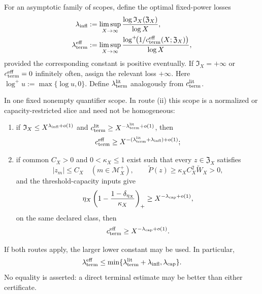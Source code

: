 For an asymptotic family of scopes, define the optimal fixed-power losses
\begin{align}
 \lambda_{\rm infl}
 &:=
 \limsup_{X\to\infty}
 \frac{\log \mathfrak I_X(\mathfrak Z_X)}{\log X},
 \label{eq:tpc64-lambda-infl-definition}\\
 \lambda_{\rm term}^{\rm eff}
 &:=
 \limsup_{X\to\infty}
 \frac{\log^+\!\bigl(
       1/c_{\rm term}^{\rm eff}(X;\mathfrak Z_X)\bigr)}
      {\log X},
 \label{eq:tpc64-lambda-term-eff-definition}
\end{align}
provided the corresponding constant is positive eventually.  If
\(\mathfrak I_X=+\infty\) or
\(c_{\rm term}^{\rm eff}=0\) infinitely often, assign the relevant loss
\(+\infty\).  Here \(\log^+u:=\max\{\log u,0\}\).  Define
\(\lambda_{\rm term}^{\rm lit}\) analogously from
\(c_{\rm term}^{\rm lit}\).

\begin{proposition}
\label{prop:tpc64-two-effective-loss-routes}
In one fixed nonempty quantifier scope.  In route \textup{(ii)} this scope
is a normalized or capacity-restricted slice and need not be homogeneous:
\begin{enumerate}[label=\textup{(\roman*)},leftmargin=3em]
 \item if
       \(\mathfrak I_X\le X^{\lambda_{\rm infl}+o(1)}\) and
       \(c_{\rm term}^{\rm lit}
          \ge X^{-\lambda_{\rm term}^{\rm lit}+o(1)}\),
       then
       \begin{equation}
        c_{\rm term}^{\rm eff}
        \ge
        X^{-(\lambda_{\rm term}^{\rm lit}
             +\lambda_{\rm infl})+o(1)};
        \label{eq:tpc64-inflated-terminal-exponent}
       \end{equation}
 \item if common \(C_X>0\) and \(0<\kappa_X\le1\) exist such that every
       \(z\in\mathfrak Z_X\) satisfies
       \[
        |z_m|\le C_X
        \quad(m\in\mathcal M_X^+),
        \qquad
        \widetilde P(z)
        \ge\kappa_XC_X^2\widetilde W_X>0,
       \]
       and the threshold-capacity inputs give
       \begin{equation}
        \eta_X
        \left(
        1-\frac{1-\delta_{\eta_X}}{\kappa_X}
        \right)_+
        \ge X^{-\lambda_{\rm cap}+o(1)},
        \label{eq:tpc64-capacity-exponent-input}
       \end{equation}
       on the same declared class, then
       \begin{equation}
        c_{\rm term}^{\rm eff}
        \ge X^{-\lambda_{\rm cap}+o(1)}.
        \label{eq:tpc64-capacity-effective-exponent}
       \end{equation}
\end{enumerate}
If both routes apply, the larger lower constant may be used.  In
particular,
\begin{equation}
 \lambda_{\rm term}^{\rm eff}
 \le
 \min\{
 \lambda_{\rm term}^{\rm lit}+\lambda_{\rm infl},
 \lambda_{\rm cap}
 \}.
 \label{eq:tpc64-best-effective-loss}
\end{equation}
No equality is asserted: a direct terminal estimate may be better than
either certificate.
\end{proposition}

